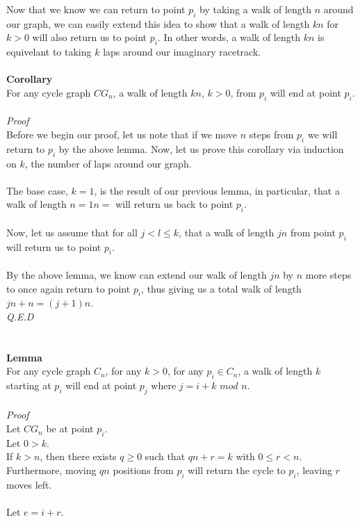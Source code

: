 \documentclass[a4paper,12pt]{article}
\begin{document}
Now that we know we can return to point $p_i$ by taking a walk of length $n$ around our graph, we can easily extend this idea to show that a walk of length $kn$ for $k > 0$ will also return us to point $p_i$. In other words, a walk of length $kn$ is equivelant to taking $k$ laps around our imaginary racetrack.\\ 
\\
\textbf{Corollary}\\
For any cycle graph $CG_n$, a walk of length $kn$, $k > 0$, from $p_i$ will end at point $p_i$.\\
\\
\textit{Proof}\\
Before we begin our proof, let us note that if we move $n$ steps from $p_i$ we will return to $p_i$ by the above lemma. Now, let us prove this corollary via induction on $k$, the number of laps around our graph.\\
\\
The base case, $k=1$, is the result of our previous lemma, in particular, that a walk of length $n = 1n=$ will return us back to point $p_i$.\\
\\
Now, let us assume that for all $j < l \leq k$, that a walk of length $jn$ from point $p_i$ will return us to point $p_i$.\\
\\
By the above lemma, we know can extend our walk of length $jn$ by $n$ more steps to once again return to point $p_i$, thus giving us a total walk of length $jn +n = (j+1)n$.\\
\textit{Q.E.D}\\
\\
\\
\textbf{Lemma}\\
For any cycle graph $C_n$, for any $k > 0$, for any $p_i \in C_n$, a walk of length $k$ starting at $p_i$ will end at point $p_j$ where $j = i + k$ $mod$ $n$.\\
\\
\textit{Proof}\\
Let $CG_n$ be at point $p_i$.\\
Let $0 > k$.\\
If $k > n$, then there exists $q \geq 0$ such that $qn + r = k$ with $0 \leq r < n$.\\
Furthermore, moving $qn$ positions from $p_i$ will return the cycle to $p_i$, leaving $r$ moves left.\\
\\
Let $e = i + r$.\\
\end{document}
